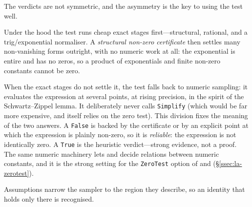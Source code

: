 The verdicts are not symmetric, and the asymmetry is the key to using the test well.

\begin{codepairs}
\end{codepairs}

Under the hood the test runs cheap exact stages first---structural, rational, and a
trig/exponential normaliser. A \emph{structural non-zero
certificate} then settles many non-vanishing forms
outright, with no numeric work at all: the exponential is entire and has no zeros, so a
product of exponentials and finite non-zero constants cannot be zero.

\begin{codepairs}
\end{codepairs}

When the exact stages do not settle it, the test falls back to numeric sampling: it
evaluates the expression at several points, at rising precision, in the spirit of the
Schwartz--Zippel lemma. It deliberately never calls
\texttt{Simplify} (which would be far more expensive, and itself relies on the zero test).
This division fixes the meaning of the two answers. A \texttt{False} is backed by the
certificate or by an explicit point at which the expression is plainly non-zero, so it is
\emph{reliable}: the expression is not identically zero. A \texttt{True} is the heuristic
verdict---strong evidence, not a proof. The same numeric machinery lets  and
 decide relations between numeric constants, and it is the strong setting for
the \texttt{ZeroTest} option of  and  (\S\ref{ssec:la-zerotest}).

Assumptions narrow the sampler to the region they describe, so an identity that holds only
there is recognised.

\begin{codepairs}
\end{codepairs}

